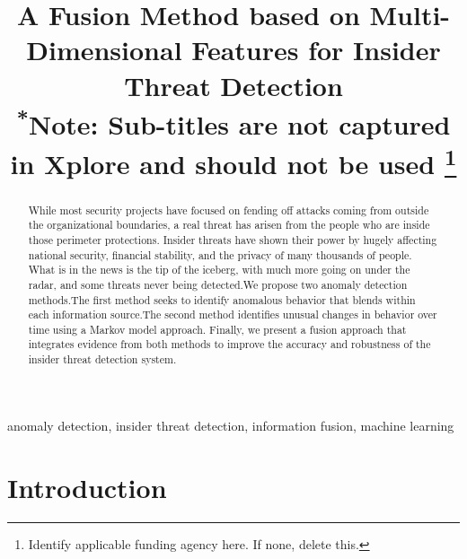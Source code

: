 \documentclass[conference]{IEEEtran}
\begin{document}
\title{A Fusion Method based on Multi-Dimensional Features for Insider Threat Detection\\
{\footnotesize \textsuperscript{*}Note: Sub-titles are not captured in Xplore and
should not be used}
\thanks{Identify applicable funding agency here. If none, delete this.}
}

\author{
\and
{}

}

\maketitle

\begin{abstract}
While most security projects have focused on fending off attacks coming from outside the organizational boundaries, a real threat has arisen from the people who are inside those perimeter protections. Insider threats have shown their power by hugely affecting national security, financial stability, and the privacy of many thousands of people. What is in the news is the tip of the iceberg, with much more going on under the radar, and some threats never being detected.We propose two anomaly detection methods.The first method seeks to identify anomalous behavior that blends within each information source.The second method identifies unusual changes in behavior over time using a Markov model approach. Finally, we present a fusion approach that integrates evidence from both methods to improve the accuracy and robustness of the insider threat detection system. 
\end{abstract}

\begin{IEEEkeywords}
anomaly detection, insider threat detection, information fusion, machine learning
\end{IEEEkeywords}

\section{Introduction}
\end{document}
